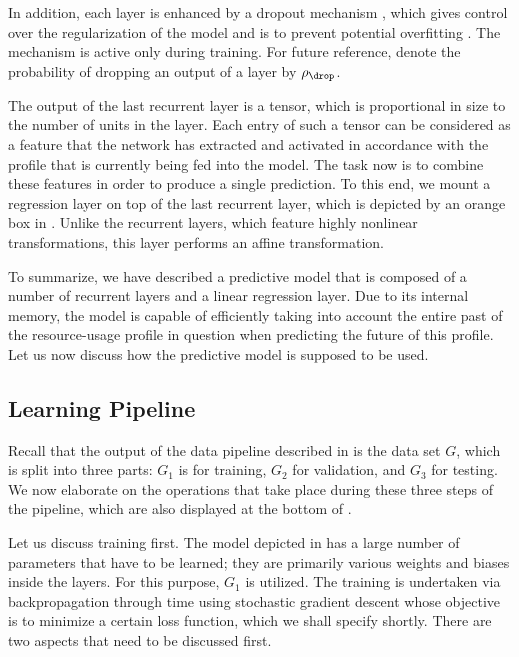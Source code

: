 In addition, each layer is enhanced by a dropout mechanism \cite{zaremba2014},
which gives control over the regularization of the model and is to prevent
potential overfitting \cite{hastie2013}. The mechanism is active only during
training. For future reference, denote the probability of dropping an output of
a layer by $\rho_\drop$.

The output of the last recurrent layer is a tensor, which is proportional in
size to the number of units in the layer. Each entry of such a tensor can be
considered as a feature that the network has extracted and activated in
accordance with the profile that is currently being fed into the model. The task
now is to combine these features in order to produce a single prediction. To
this end, we mount a regression layer on top of the last recurrent layer, which
is depicted by an orange box in . Unlike the recurrent layers,
which feature highly nonlinear transformations, this layer performs an affine
transformation.

To summarize, we have described a predictive model that is composed of a number
of recurrent layers and a linear regression layer. Due to its internal memory,
the model is capable of efficiently taking into account the entire past of the
resource-usage profile in question when predicting the future of this profile.
Let us now discuss how the predictive model is supposed to be used.

\subsection{Learning Pipeline}

Recall that the output of the data pipeline described in  is
the data set $G$, which is split into three parts: $G_1$ is for training, $G_2$
for validation, and $G_3$ for testing. We now elaborate on the operations that
take place during these three steps of the pipeline, which are also displayed at
the bottom of .

Let us discuss training first. The model depicted in  has a
large number of parameters that have to be learned; they are primarily various
weights and biases inside the layers. For this purpose, $G_1$ is utilized. The
training is undertaken via backpropagation through time using stochastic
gradient descent \cite{goodfellow2016} whose objective is to minimize a certain
loss function, which we shall specify shortly. There are two aspects that need
to be discussed first.

